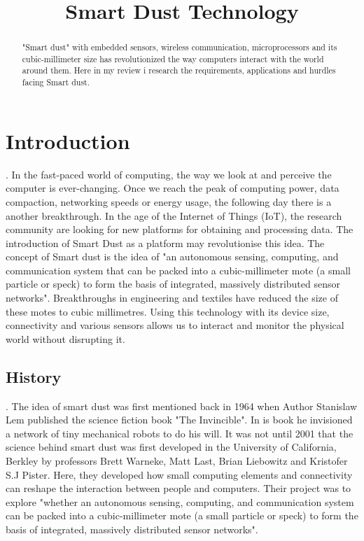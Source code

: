 \documentclass[article]{IEEEtran}
\begin{document}
\title{Smart Dust Technology }
\author
{
}

\maketitle

\begin{abstract}
"Smart dust" with embedded sensors, wireless communication, microprocessors and its cubic-millimeter size has revolutionized the way computers interact with the world around them. Here in my review i research the requirements, applications and hurdles facing Smart dust.
\end{abstract}


\section{Introduction}.\newline
In the fast-paced world of computing, the way we look at and perceive the computer is ever-changing. Once we reach the peak of computing power, data compaction, networking speeds or energy usage, the following day there is a another breakthrough. In the age of the Internet of Things (IoT)\cite{Lightweight}, the research community are looking for new platforms for obtaining and processing data. The introduction of Smart Dust as a platform may revolutionise this idea. 
The concept of Smart dust is the idea of  "an autonomous sensing, computing, and communication system that can be packed into a cubic-millimeter mote (a small particle or speck) to form the basis of integrated, massively distributed sensor networks"\cite{Mili}. Breakthroughs in engineering and textiles have reduced the size of these motes to cubic millimetres\cite{textiles}. Using this technology with its device size, connectivity and various sensors allows us to interact and monitor the physical world without disrupting it.\cite{MobNet}


\subsection*{History}.\newline
The idea of smart dust was first mentioned back in 1964 when Author Stanislaw Lem published the science fiction book "The Invincible". In is book he invisioned a network of tiny mechanical robots to do his will\cite{leminvincible}. It was not until 2001 that the science behind smart dust was first developed in the University of California, Berkley by professors Brett Warneke, Matt Last, Brian Liebowitz and Kristofer S.J Pister. 
Here, they developed how small computing elements and connectivity can reshape the interaction between people and computers. Their project was to explore "whether an autonomous sensing, computing, and communication system can be packed into a cubic-millimeter mote (a small particle or speck) to form the basis of integrated, massively distributed sensor networks"\cite{Mili}. 
\end{document}
